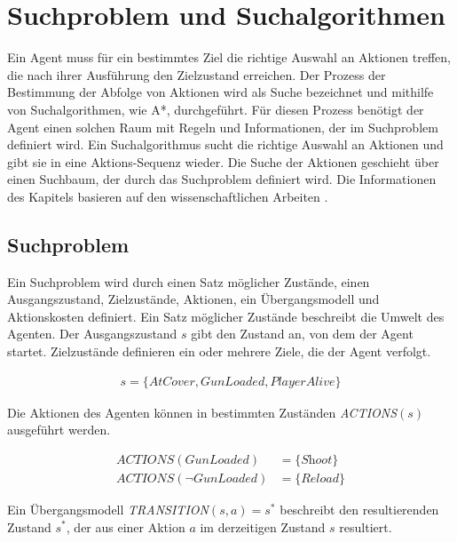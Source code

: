 \chapter{Suchproblem und Suchalgorithmen}
\label{chap:suchproblem und suchalgorithmen}

Ein Agent muss f\"{u}r ein bestimmtes Ziel die richtige Auswahl an Aktionen treffen, die nach ihrer Ausf\"{u}hrung den Zielzustand erreichen. Der Prozess der Bestimmung der Abfolge von Aktionen wird als Suche bezeichnet und mithilfe von Suchalgorithmen, wie A*, durchgef\"{u}hrt. F\"{u}r diesen Prozess ben\"{o}tigt der Agent einen solchen Raum mit Regeln und Informationen, der im Suchproblem definiert wird. Ein Suchalgorithmus sucht die richtige Auswahl an Aktionen und gibt sie in eine Aktions-Sequenz wieder. Die Suche der Aktionen geschieht \"{u}ber einen Suchbaum, der durch das Suchproblem definiert wird. Die Informationen des Kapitels basieren auf den wissenschaftlichen Arbeiten \autocite{RN2020, 4082128, Felner2011}.

\section{Suchproblem}
\label{chap:suchproblem}

Ein Suchproblem wird durch einen Satz m\"{o}glicher Zust\"{a}nde, einen Ausgangszustand, Zielzust\"{a}nde, Aktionen, ein \"{U}bergangsmodell und Aktionskosten definiert. Ein Satz m\"{o}glicher Zust\"{a}nde beschreibt die Umwelt des Agenten. Der Ausgangszustand $s$ gibt den Zustand an, von dem der Agent startet. Zielzust\"{a}nde definieren ein oder mehrere Ziele, die der Agent verfolgt.


\begin{align}
	s = \{\textit{AtCover}, \textit{GunLoaded}, \textit{PlayerAlive}\}
\end{align}


Die Aktionen des Agenten k\"{o}nnen in bestimmten Zust\"{a}nden \textit{ACTIONS}$(s)$ ausgef\"{u}hrt werden.

\begin{align}
	\textit{ACTIONS}(\textit{GunLoaded}) &= \{\textit{Shoot}\} \\
	\textit{ACTIONS}(\lnot \textit{GunLoaded}) &= \{\textit{Reload}\}
\end{align}

Ein \"{U}bergangsmodell \textit{TRANSITION}$(s,a) = s^*$ beschreibt den resultierenden Zustand $s^*$, der aus einer Aktion $a$ im derzeitigen Zustand $s$ resultiert.

